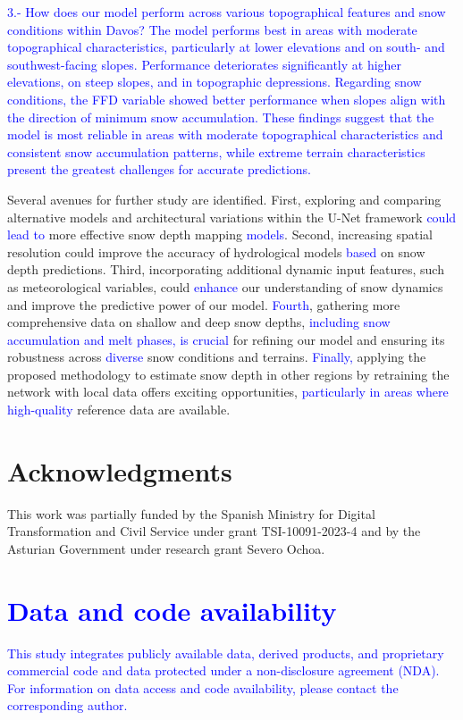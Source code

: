\documentclass[preprint,12pt]{elsarticle}
\begin{document}
\textcolor{blue}{
3.- How does our model perform across various topographical features and snow conditions within Davos?
The model performs best in areas with moderate topographical characteristics, particularly at lower elevations and on south- and southwest-facing slopes. Performance deteriorates significantly at higher elevations, on steep slopes, and in topographic depressions. Regarding snow conditions, the FFD variable showed better performance when slopes align with the direction of minimum snow accumulation. These findings suggest that the model is most reliable in areas with moderate topographical characteristics and consistent snow accumulation patterns, while extreme terrain characteristics present the greatest challenges for accurate predictions.}

Several avenues for further study are identified. First, exploring and comparing alternative models and architectural variations within the U-Net framework \textcolor{blue}{could lead to} more effective snow depth mapping \textcolor{blue}{models}. Second, increasing spatial resolution could improve the accuracy of hydrological models \textcolor{blue}{based} on snow depth predictions. Third, incorporating additional dynamic input features, such as meteorological variables, could \textcolor{blue}{enhance} our understanding of snow dynamics and improve the predictive power of our model. \textcolor{blue}{Fourth}, gathering more comprehensive data on shallow and deep snow depths, \textcolor{blue}{including snow accumulation and melt phases, is crucial} for refining our model and ensuring its robustness across \textcolor{blue}{diverse} snow conditions and terrains. \textcolor{blue}{Finally,} applying the proposed methodology to estimate snow depth in other regions by retraining the network with local data offers exciting opportunities, \textcolor{blue}{particularly in areas where high-quality} reference data are available.

\section*{Acknowledgments}

This work was partially funded by the Spanish Ministry for Digital Transformation and Civil Service under grant TSI-10091-2023-4 and by the Asturian Government under research grant Severo Ochoa.

\section*{\textcolor{blue}{Data and code availability}}

\textcolor{blue}{This study integrates publicly available data, derived products, and proprietary commercial code and data protected under a non-disclosure agreement (NDA). For information on data access and code availability, please contact the corresponding author.}

 

\end{document}
